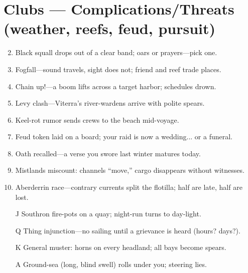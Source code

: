 \section*{Clubs --- Complications/Threats (weather, reefs, feud, pursuit)}
\begin{enumerate}
\setcounter{enumi}{1}
\item Black squall drops out of a clear band; oars or prayers---pick one.
\item Fogfall---sound travels, sight does not; friend and reef trade places.
\item Chain up!---a boom lifts across a target harbor; schedules drown.
\item Levy clash---Viterra's river-wardens arrive with polite spears.
\item Keel-rot rumor sends crews to the beach mid-voyage.
\item Feud token laid on a board; your raid is now a wedding... or a funeral.
\item Oath recalled---a verse you swore last winter matures today.
\item Mistlands miscount: channels ``move,'' cargo disappears without witnesses.
\item Aberderrin race---contrary currents split the flotilla; half are late, half are lost.
\item[J] Southron fire-pots on a quay; night-run turns to day-light.
\item[Q] Thing injunction---no sailing until a grievance is heard (hours? days?).
\item[K] General muster: horns on every headland; all bays become spears.
\item[A] Ground-sea (long, blind swell) rolls under you; steering lies.
\end{enumerate}


